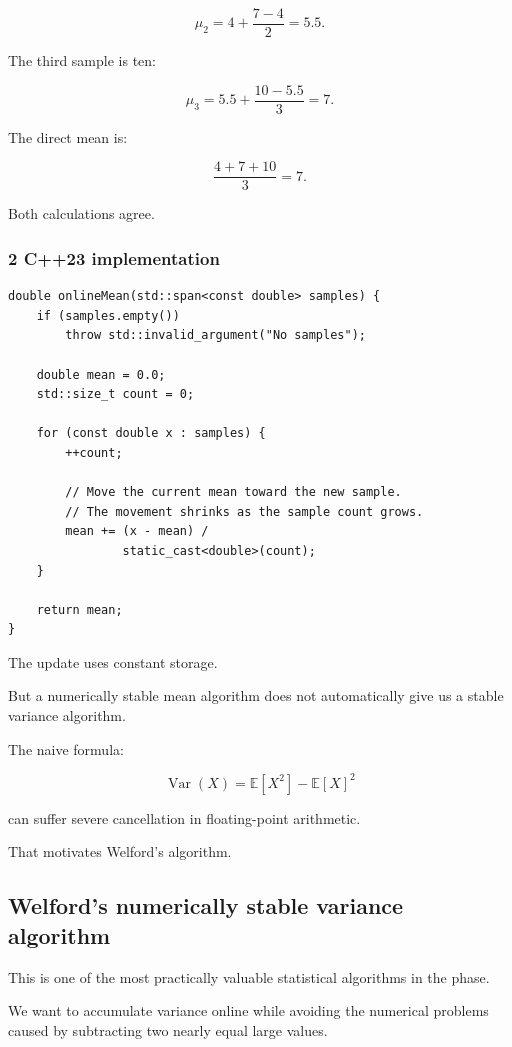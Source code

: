 \[
 \mu_2 = 4+\frac{7-4}{2} =5.5.
\]

The third sample is ten:

\[
 \mu_3 = 5.5+\frac{10-5.5}{3} =7.
\]

The direct mean is:

\[
 \frac{4+7+10}{3}=7.
\]

Both calculations agree.

\subsubsection{2 C++23 implementation}\label{02-foundations-ii-ch030-c23-implementation}

\begin{verbatim}
double onlineMean(std::span<const double> samples) {
    if (samples.empty())
        throw std::invalid_argument("No samples");

    double mean = 0.0;
    std::size_t count = 0;

    for (const double x : samples) {
        ++count;

        // Move the current mean toward the new sample.
        // The movement shrinks as the sample count grows.
        mean += (x - mean) /
                static_cast<double>(count);
    }

    return mean;
}
\end{verbatim}

The update uses constant storage.

But a numerically stable mean algorithm does not automatically give us a stable variance algorithm.

The naive formula:

\[
 \operatorname{Var}(X)= \mathbb E[X^2]-\mathbb E[X]^2
\]

can suffer severe cancellation in floating-point arithmetic.

That motivates Welford's algorithm.

\subsection{Welford's numerically stable variance algorithm}\label{02-foundations-ii-ch030-welfords-numerically-stable-variance-algorithm}

This is one of the most practically valuable statistical algorithms in the phase.

We want to accumulate variance online while avoiding the numerical problems caused by subtracting two nearly equal large values.

